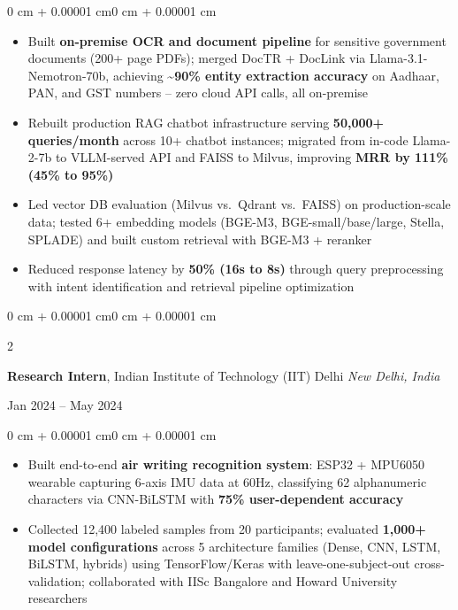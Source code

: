 \documentclass[10pt, letterpaper]{article}
\newenvironment{highlights}{
    \begin{itemize}[
        topsep=0.01 cm,
        parsep=0.01 cm,
        partopsep=0pt,
        itemsep=0pt,
        leftmargin=0 cm + 10pt
    ]
}{
    \end{itemize}
}
\newenvironment{onecolentry}{
    \begin{adjustwidth}{0 cm + 0.00001 cm}{0 cm + 0.00001 cm}
}{
    \end{adjustwidth}
}
\newenvironment{twocolentry}[2][]{
    \onecolentry
    \def\secondColumn{#2}
    \setcolumnwidth{\fill, 5.5 cm}
    \begin{paracol}{2}
}{
    \switchcolumn \raggedleft \secondColumn
    \end{paracol}
    \endonecolentry
}
\begin{document}
        \vspace{0.02 cm}
        \begin{onecolentry}
            \begin{highlights}
                \item Built \textbf{on-premise OCR and document pipeline} for sensitive government documents (200+ page PDFs); merged DocTR + DocLink via Llama-3.1-Nemotron-70b, achieving \textasciitilde\textbf{90\% entity extraction accuracy} on Aadhaar, PAN, and GST numbers -- zero cloud API calls, all on-premise
                \item Rebuilt production RAG chatbot infrastructure serving \textbf{50,000+ queries/month} across 10+ chatbot instances; migrated from in-code Llama-2-7b to VLLM-served API and FAISS to Milvus, improving \textbf{MRR by 111\% (45\% to 95\%)}
                \item Led vector DB evaluation (Milvus vs.\ Qdrant vs.\ FAISS) on production-scale data; tested 6+ embedding models (BGE-M3, BGE-small/base/large, Stella, SPLADE) and built custom retrieval with BGE-M3 + reranker
                \item Reduced response latency by \textbf{50\% (16s to 8s)} through query preprocessing with intent identification and retrieval pipeline optimization
            \end{highlights}
        \end{onecolentry}

        \vspace{0.05 cm}

        \begin{twocolentry}{
            Jan 2024 -- May 2024
        }
            \textbf{Research Intern}, Indian Institute of Technology (IIT) Delhi \hfill \textit{New Delhi, India}
        \end{twocolentry}

        \vspace{0.02 cm}
        \begin{onecolentry}
            \begin{highlights}
                \item Built end-to-end \textbf{air writing recognition system}: ESP32 + MPU6050 wearable capturing 6-axis IMU data at 60Hz, classifying 62 alphanumeric characters via CNN-BiLSTM with \textbf{75\% user-dependent accuracy}
                \item Collected 12,400 labeled samples from 20 participants; evaluated \textbf{1,000+ model configurations} across 5 architecture families (Dense, CNN, LSTM, BiLSTM, hybrids) using TensorFlow/Keras with leave-one-subject-out cross-validation; collaborated with IISc Bangalore and Howard University researchers
            \end{highlights}
        \end{onecolentry}
\end{document}
